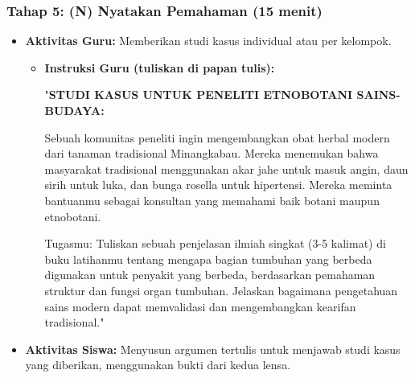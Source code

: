 \documentclass[a4paper,12pt]{article}
\begin{document}
\subsubsection{Tahap 5: (N) Nyatakan Pemahaman (15 menit)}
\begin{itemize}
\item \textbf{Aktivitas Guru:} Memberikan studi kasus individual atau per kelompok.
    \begin{itemize}
    \item \textbf{Instruksi Guru (tuliskan di papan tulis):}
    
    "\textbf{STUDI KASUS UNTUK PENELITI ETNOBOTANI SAINS-BUDAYA:}
    
    Sebuah komunitas peneliti ingin mengembangkan obat herbal modern dari tanaman tradisional Minangkabau. Mereka menemukan bahwa masyarakat tradisional menggunakan akar jahe untuk masuk angin, daun sirih untuk luka, dan bunga rosella untuk hipertensi. Mereka meminta bantuanmu sebagai konsultan yang memahami baik botani maupun etnobotani.
    
    Tugasmu: Tuliskan sebuah penjelasan ilmiah singkat (3-5 kalimat) di buku latihanmu tentang mengapa bagian tumbuhan yang berbeda digunakan untuk penyakit yang berbeda, berdasarkan pemahaman struktur dan fungsi organ tumbuhan. Jelaskan bagaimana pengetahuan sains modern dapat memvalidasi dan mengembangkan kearifan tradisional."
    \end{itemize}
\item \textbf{Aktivitas Siswa:} Menyusun argumen tertulis untuk menjawab studi kasus yang diberikan, menggunakan bukti dari kedua lensa.
\end{itemize}
\end{document}
